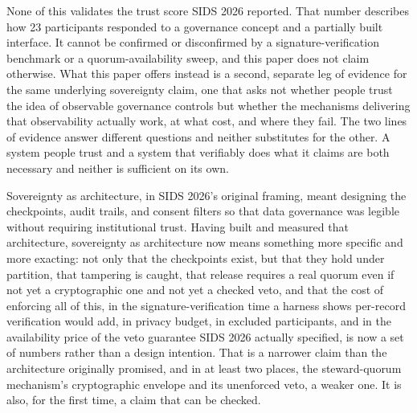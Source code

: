 None of this validates the trust score SIDS 2026 reported. That number describes how 23 participants responded to a governance concept and a partially built interface. It cannot be confirmed or disconfirmed by a signature-verification benchmark or a quorum-availability sweep, and this paper does not claim otherwise. What this paper offers instead is a second, separate leg of evidence for the same underlying sovereignty claim, one that asks not whether people trust the idea of observable governance controls but whether the mechanisms delivering that observability actually work, at what cost, and where they fail. The two lines of evidence answer different questions and neither substitutes for the other. A system people trust and a system that verifiably does what it claims are both necessary and neither is sufficient on its own.

Sovereignty as architecture, in SIDS 2026's original framing, meant designing the checkpoints, audit trails, and consent filters so that data governance was legible without requiring institutional trust. Having built and measured that architecture, sovereignty as architecture now means something more specific and more exacting: not only that the checkpoints exist, but that they hold under partition, that tampering is caught, that release requires a real quorum even if not yet a cryptographic one and not yet a checked veto, and that the cost of enforcing all of this, in the signature-verification time a harness shows per-record verification would add, in privacy budget, in excluded participants, and in the availability price of the veto guarantee SIDS 2026 actually specified, is now a set of numbers rather than a design intention. That is a narrower claim than the architecture originally promised, and in at least two places, the steward-quorum mechanism's cryptographic envelope and its unenforced veto, a weaker one. It is also, for the first time, a claim that can be checked.
